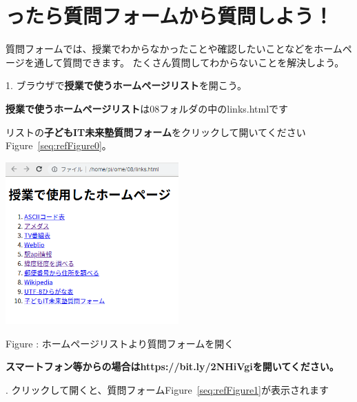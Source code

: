 \documentclass[a4paper,12pt,dvipdfmx]{jarticle}
\newcounter{Figure}
\renewcommand\theFigure{\arabic{Figure}}
\begin{document}
\section{ったら質問フォームから質問しよう！}
質問フォームでは、授業でわからなかったことや確認したいことなどをホームページを通して質問できます。
たくさん質問してわからないことを解決しよう。

1.
ブラウザで\textbf{授業で使うホームページリスト}を開こう。

\textbf{授業で使うホームページリスト}は08フォルダの中のlinks.htmlです

リストの\textbf{子どもIT未来塾質問フォーム}をクリックして開いてくださいFigure~\ref{seq:refFigure0}。



\begin{center}
\begin{minipage}{10.88cm}


\includegraphics[width=6.638cm]{textbook-img017.png}


\bigskip


\bigskip

Figure {\theFigure\label{seq:refFigure0}}:
ホームページリストより質問フォームを開く
\end{minipage}
\end{center}
{\bfseries
スマートフォン等からの場合はhttps://bit.ly/2NHiVgiを開いてください。}


\bigskip

.
クリックして開くと、質問フォームFigure~\ref{seq:refFigure1}が表示されます
\end{document}
